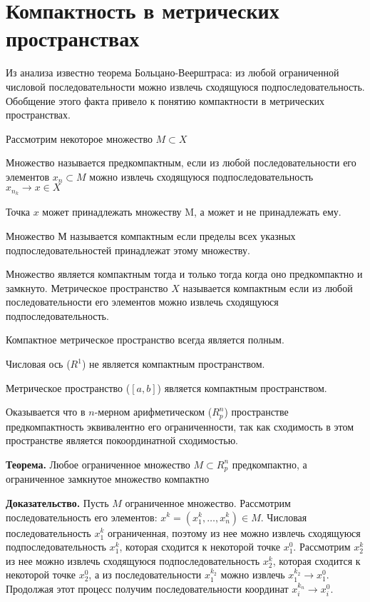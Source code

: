 \documentclass[12pt]{report}
\renewcommand{\[}{$\\\displaystyle}
\renewcommand{\]}{\\$}
\renewcommand{\[}{$\\\displaystyle}
\newcommand{\tth}[1][]{\textbf{Теорема#1.}}
\newcommand{\btev}[1][]{\textbf{Доказательство#1.}
}
\begin{document}
\section{Компактность в метрических пространствах}

Из анализа известно теорема Больцано-Веерштраса: из любой ограниченной числовой последовательности можно извлечь сходящуюся подпоследовательность. Обобщение этого факта привело к понятию компактности в метрических пространствах.

Рассмотрим некоторое множество $M\subset X$

Множество называется предкомпактным, если из любой последовательности его элементов ${x_n}\subset M$ можно извлечь сходящуюся подпоследовательность $x_{n_k}\rightarrow x\in X$

Точка $x$ может принадлежать множеству M, а может и не принадлежать ему.

Множество $М$ называется компактным если пределы всех указных подпоследовательностей принадлежат этому множеству.

Множество является компактным тогда и только тогда когда оно предкомпактно и замкнуто. Метрическое пространство $X$ называется компактным если из любой последовательности его элементов можно извлечь сходящуюся подпоследовательность.

Компактное метрическое пространство всегда является полным.

Числовая ось ($R^1$) не является компактным пространством.

Метрическое пространство ($[a,b]$) является компактным пространством.

Оказывается что в $n$-мерном арифметическом ($R_p^n$) пространстве предкомпактность эквивалентно его ограниченности, так как сходимость в этом пространстве является покоординатной сходимостью.

\tth[] Любое ограниченное множество $M\subset R_p^n$ предкомпактно, а ограниченное замкнутое множество компактно

\btev[] Пусть $M$ ограниченное множество. Рассмотрим последовательность его элементов: $x^k=(x_1^k,\dots,x_n^k)\in M$.
Числовая последовательность $x_1^k$ ограниченная, поэтому из нее можно извлечь сходящуюся подпоследовательность $x_1^k$, которая сходится к некоторой точке $x_1^0$.
Рассмотрим $x_2^k$ из нее можно извлечь сходящуюся подпоследовательность $x_2^k$, которая сходится к некоторой точке $x_2^0$, а из последовательности $x_1^{k_2}$ можно извлечь $x_1^{k_2}\rightarrow x_1^0$. Продолжая этот процесс получим последовательности координат $x_i^{k_n}\rightarrow x_i^0$.
\end{document}
